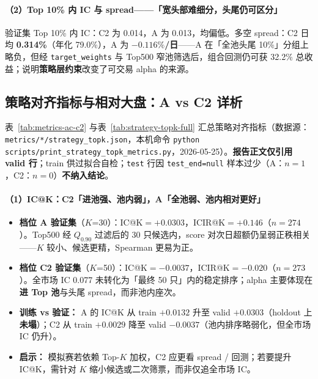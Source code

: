 \documentclass[UTF8,a4paper,12pt]{ctexart}
\begin{document}
\paragraph{（2）Top 10\% 内 IC 与 spread——「宽头部难细分，头尾仍可区分」}

验证集 Top 10\% 内 IC：C2 为 0.014，A 为 0.013，均偏低。多空 spread：C2 日均 \textbf{0.314\%}（年化 79.0\%），A 为 \textbf{$-0.116\%$/日}——A 在「全池头尾 10\%」分组上略负，但经 \texttt{target\_weights} 与 Top500 窄池筛选后，组合回测仍可获 32.2\% 总收益；说明\textbf{策略层约束}改变了可交易 alpha 的来源。

\subsection{策略对齐指标与相对大盘：A vs C2 详析}
\label{sec:strategy-metrics}

表~\ref{tab:metrics-ac-c2} 与表~\ref{tab:strategy-topk-full} 汇总策略对齐指标（数据源：\texttt{metrics/*/strategy\_topk.json}，本机命令 \texttt{python scripts/print\_strategy\_topk\_metrics.py}，2026-05-25）。\textbf{报告正文仅引用 valid 行}；train 供过拟合自检；\texttt{test} 行因 \texttt{test\_end=null} 样本过少（A：$n=1$，C2：$n=0$）\textbf{不纳入结论}。

\paragraph{（1）IC@K：C2「进池强、池内弱」，A「全池弱、池内相对更好」}

\begin{itemize}[leftmargin=2em]
  \item \textbf{档位 A 验证集}（$K$=30）：IC@K$=+0.0303$，ICIR@K$=+0.146$（$n=274$）。Top500 经 $Q_{0.90}$ 过滤后的 30 只候选内，score 对次日超额仍呈弱正秩相关——$K$ 较小、候选更精，Spearman 更易为正。
  \item \textbf{档位 C2 验证集}（$K$=50）：IC@K$=-0.0037$，ICIR@K$=-0.020$（$n=273$）。全市场 IC 0.077 未转化为「最终 50 只」内的稳定排序；alpha 主要体现在\textbf{进 Top 池}与头尾 spread，而非池内座次。
  \item \textbf{训练 vs 验证：} A 的 IC@K 从 train $+0.0132$ 升至 valid $+0.0303$（holdout 上\textbf{未塌}）；C2 从 train $+0.0029$ 降至 valid $-0.0037$（池内排序略弱化，但全市场 IC 仍升）。
  \item \textbf{启示：} 模拟赛若依赖 Top-$K$ 加权，C2 应更看 spread / 回测；若要提升 IC@K，需针对 $K$ 缩小候选或二次筛票，而非仅追全市场 IC。
\end{itemize}
\end{document}
